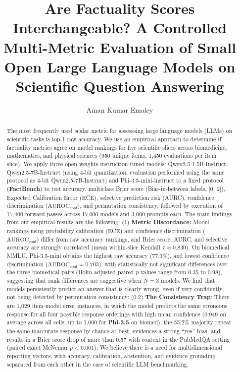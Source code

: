 \documentclass[sigconf,nonacm]{acmart}
\title{Are Factuality Scores Interchangeable? A Controlled Multi-Metric Evaluation of Small Open Large Language Models on Scientific Question Answering}
\author{Aman Kumar Emaley}
\affiliation{%
  \institution{Indian Institute of Information Technology, Allahabad}
  \department{Department of Information Technology}
  \city{Prayagraj}
  \state{Uttar Pradesh}
  \country{India}
}
\makeatletter
\DeclareRobustCommand{\_}{\ifmmode\nfss@text{\textunderscore}\else\textunderscore\allowbreak\fi}
\makeatother
\begin{document}
\begin{abstract}
The most frequently used scalar metric for assesssing large language models (LLMs) on scientific tasks is top-1 raw accuracy. We use an empirical approach to determine if factuality metrics agree on model rankings for five scientific slices across biomedicine, mathematics, and physical sciences (950 unique items, 1,450 evaluations per item slice). We apply three open-weights instruction-tuned models: \textsf{Qwen2.5-1.5B-Instruct}, \textsf{Qwen2.5-7B-Instruct} (using 4-bit quantization; evaluation performed using the same protocol as 4-bit Qwen2.5-7B-Instruct) and \textsf{Phi-3.5-mini-instruct} to a fixed protocol (\textbf{FactBench}) to test accuracy, multiclass Brier score (Bias-in-between labels, [0, 2]), Expected Calibration Error (ECE), selective prediction risk (AURC), confidence discrimination ($\text{AUROC}_{\text{conf}}$), and permutation consistency, followed by execution of 17,400 forward passes across 17,000 models and 3,000 prompts each. The main findings from our empirical results are the following: (1) \textbf{Metric Discordance:} Model rankings using probability calibration (ECE) and confidence discrimination ($\text{AUROC}_{\text{conf}}$) differ from raw accuracy rankings, and Brier score, AURC, and selective accuracy are strongly correlated (mean within-slice Kendall $\tau \approx 0.830$). On biomedical MMLU, \textsf{Phi-3.5-mini} obtains the highest raw accuracy (77.3\%), and lowest confidence discrimination ($\text{AUROC}_{\text{conf}} = 0.703$), with statistically not significant differences over the three biomedical pairs (Holm-adjusted paired $p$ values range from 0.35 to 0.98), suggesting that rank differences are suggestive when $N=3$ models. We find that models persistently predict an answer that is clearly wrong, even if very confidently, not being detected by permutation consistency: (0.2) \textbf{The Consistency Trap}: There are 1,029 item-model error instances, in which the model predicts the same erroneous response for all four possible response orderings with high mean confidence (0.949 on average across all cells, up to 1.000 for \textbf{Phi-3.5} on biomed); the 55.2\% majority repeat the same inaccurate response by chance at best, evidences a strong ``yes'' bias, and results in a Brier score drop of more than 0.57 with context in the PubMedQA setting (paired exact McNemar $p < 0.001$). We believe there is a need for multidimensional reporting vectors, with accuracy, calibration, abstention, and evidence grounding separated from each other in the case of scientific LLM benchmarking.
\end{abstract}
\end{document}
